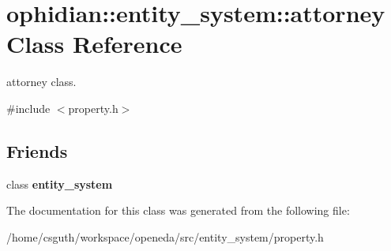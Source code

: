 \hypertarget{classophidian_1_1entity__system_1_1attorney}{\section{ophidian\-:\-:entity\-\_\-system\-:\-:attorney Class Reference}
\label{classophidian_1_1entity__system_1_1attorney}
}


attorney class.  




{\ttfamily \#include $<$property.\-h$>$}

\subsection*{Friends}
\begin{DoxyCompactItemize}
\item 
\hypertarget{classophidian_1_1entity__system_1_1attorney_ae35143560cacb8d58624ec72433e6507}{class {\bfseries entity\-\_\-system}}\label{classophidian_1_1entity__system_1_1attorney_ae35143560cacb8d58624ec72433e6507}

\end{DoxyCompactItemize}


The documentation for this class was generated from the following file\-:\begin{DoxyCompactItemize}
\item 
/home/csguth/workspace/openeda/src/entity\-\_\-system/property.\-h\end{DoxyCompactItemize}
